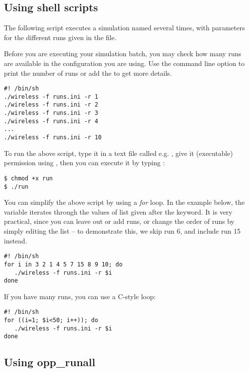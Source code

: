 \subsection{Using shell scripts}

The following script executes a simulation named 
several times, with parameters for the different runs
given in the  file.

Before you are executing your simulation batch, you may check how many
runs are available in the configuration you are using. Use the
 command line option to print the number of runs or
add the  to get more details.

\begin{verbatim}
#! /bin/sh
./wireless -f runs.ini -r 1
./wireless -f runs.ini -r 2
./wireless -f runs.ini -r 3
./wireless -f runs.ini -r 4
...
./wireless -f runs.ini -r 10
\end{verbatim}

To run the above script, type it in a text file called e.g. ,
give it  (executable) permission using ,
then you can execute it by typing :

\begin{verbatim}
$ chmod +x run
$ ./run
\end{verbatim}

You can simplify the above script by using a \textit{for} loop.
In the example below, the variable  iterates through
the values of list given after the  keyword.
It is very practical, since you can leave out or add runs,
or change the order of runs by simply editing the list --
to demonstrate this, we skip run 6, and include run 15 instead.

\begin{verbatim}
#! /bin/sh
for i in 3 2 1 4 5 7 15 8 9 10; do
   ./wireless -f runs.ini -r $i
done
\end{verbatim}

If you have many runs, you can use a C-style loop:

\begin{verbatim}
#! /bin/sh
for ((i=1; $i<50; i++)); do
   ./wireless -f runs.ini -r $i
done
\end{verbatim}

\subsection{Using opp\_runall}

